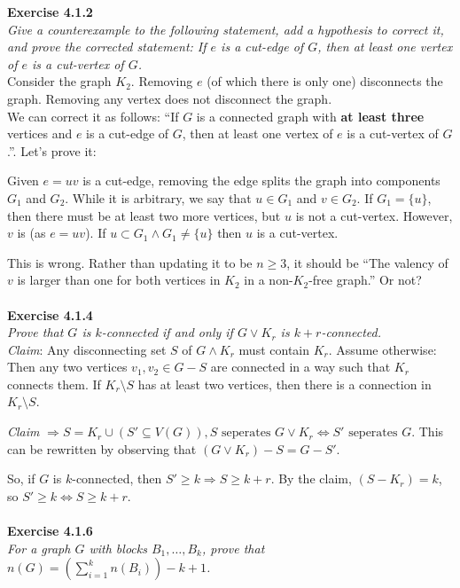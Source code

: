 \noindent
\textbf{Exercise 4.1.2 }\\
\noindent
\textit{Give a counterexample to the following statement, add a hypothesis to correct it, and prove the corrected statement: If $e$ is a cut-edge of $G$, then at least one vertex of $e$ is a cut-vertex of $G$.}\\
Consider the graph $K_{2}$. Removing $e$ (of which there is only one) disconnects the graph. Removing any vertex does not disconnect the graph.\\
We can correct it as follows:
``If $G$ is a connected graph with \textbf{at least three} vertices and $e$ is a cut-edge of $G$, then at least one vertex of $e$ is a cut-vertex of $G$.''. Let's prove it:

Given $e = uv$ is a cut-edge, removing the edge splits the graph into components $G_{1}$ and $G_{2}$. While it is arbitrary, we say that $u \in G_{1}$ and $v \in G_{2}$. If $G_{1} = \{u\}$, then there must be at least two more vertices, but $u$ is not a cut-vertex. However, $v$ is (as $e = uv$). If $u \subset G_{1} \land G_{1} \ne \{u\}$ then $u$ is a cut-vertex.

This is wrong. Rather than updating it to be $n \ge 3$, it should be ``The valency of $v$ is larger than one for both vertices in $K_{2}$ in a non-$K_{2}$-free graph.'' Or not?
\\\\
\noindent
\textbf{Exercise 4.1.4 }\\
\noindent
\textit{Prove that $G$ is $k$-connected if and only if $G \lor K_{r}$ is $k+r$-connected.}\\
\textit{Claim}: Any disconnecting set $S$ of $G \land K_{r}$ must contain $K_{r}$. Assume otherwise: Then any two vertices $v_{1}, v_{2} \in G - S$ are connected in a way such that $K_{r}$ connects them.  If $K_{r} \setminus S$ has at least two vertices, then there is a connection in $K_{r} \setminus S$.

\textit{Claim} \(\Rightarrow S = K_{r} \cup (S' \subseteq V(G)), S \text{ seperates } G \vee K_{r} \iff S' \text{ seperates } G\). This can be rewritten by observing that $(G \vee K_{r}) - S = G - S'$.

So, if $G$ is $k$-connected, then $S' \ge k \Rightarrow S \ge k+r$. By the claim, $(S-K_{r}) = k$, so $S' \ge k \iff S \ge k+r$.
\\\\
\noindent
\textbf{Exercise 4.1.6 }\\
\noindent
\textit{For a graph $G$ with blocks $B_{1}, \ldots, B_{k}$, prove that $n(G) = (\sum_{i=1}^k n(B_{i}))-k+1$.}\\

